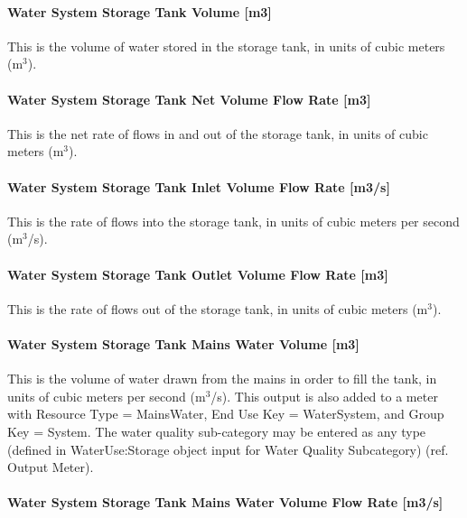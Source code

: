 \paragraph{Water System Storage Tank Volume {[}m3{]}}\label{water-system-storage-tank-volume-m3}

This is the volume of water stored in the storage tank, in units of cubic meters (m\(^{3}\)).

\paragraph{Water System Storage Tank Net Volume Flow Rate {[}m3{]}}\label{water-system-storage-tank-net-volume-flow-rate-m3}

This is the net rate of flows in and out of the storage tank, in units of cubic meters (m\(^{3}\)).

\paragraph{Water System Storage Tank Inlet Volume Flow Rate {[}m3/s{]}}\label{water-system-storage-tank-inlet-volume-flow-rate-m3s}

This is the rate of flows into the storage tank, in units of cubic meters per second (m\(^{3}\)/s).

\paragraph{Water System Storage Tank Outlet Volume Flow Rate {[}m3{]}}\label{water-system-storage-tank-outlet-volume-flow-rate-m3}

This is the rate of flows out of the storage tank, in units of cubic meters (m\(^{3}\)).

\paragraph{Water System Storage Tank Mains Water Volume {[}m3{]}}\label{water-system-storage-tank-mains-water-volume-m3}

This is the volume of water drawn from the mains in order to fill the tank, in units of cubic meters per second (m\(^{3}\)/s). This output is also added to a meter with Resource Type = MainsWater, End Use Key = WaterSystem, and Group Key = System. The water quality sub-category may be entered as any type (defined in WaterUse:Storage object input for Water Quality Subcategory) (ref. Output Meter).

\paragraph{Water System Storage Tank Mains Water Volume Flow Rate {[}m3/s{]}}\label{water-system-storage-tank-mains-water-volume-flow-rate-m3s}

